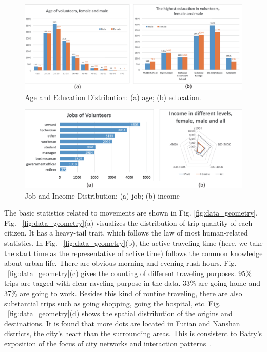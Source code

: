 \documentclass{ieeeaccess}
\begin{document}
\begin{figure}[htb!]
 \centering %
 \includegraphics[width=\columnwidth]{pictures/data1}
 \caption{Age and Education Distribution: (a) age; (b) education.}
 \label{fig:data_age_edu}
\end{figure}


\begin{figure}[htb!]
 \centering %
 \includegraphics[width=\columnwidth]{pictures/data2}
 \caption{Job and Income Distribution: (a) job; (b) income}
 \label{fig:data_job_inc}
\end{figure}
\fi

The basic statistics related to movements are shown in Fig. \ref{fig:data_geometry}. Fig. ~\ref{fig:data_geometry}(a) visualizes the distribution of trip quantity of each citizen. It has a heavy-tail trait, which follows the law of most human-related statistics. In Fig. ~\ref{fig:data_geometry}(b), the active traveling time (here, we take the start time as the representative of active time) follows the common knowledge about urban life. There are obvious morning and evening rush hours. Fig. ~\ref{fig:data_geometry}(c) gives the counting of different traveling purposes. 95\% trips are tagged with clear raveling purpose in the data. 33\% are going home and 37\% are going to work. Besides this kind of routine traveling, there are also substantial trips such as going shopping, going the hospital, etc. Fig. ~\ref{fig:data_geometry}(d) shows the spatial distribution of the origins and destinations. It is found that more dots are located in Futian and Nanshan districts, the city's heart than the surrounding areas. This is consistent to Batty's exposition of the focus of city networks and interaction patterns~\cite{batty2013new}.
\end{document}
